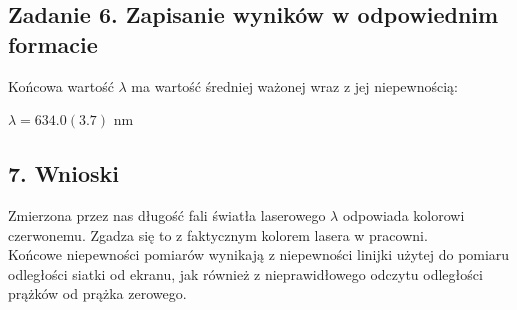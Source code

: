 \documentclass[12pt]{article}
\begin{document}
\subsection*{Zadanie 6. Zapisanie wyników w odpowiednim formacie}
Końcowa wartość $\lambda$ ma wartość średniej ważonej wraz z jej niepewnością:
\begin{center}
    $\lambda = 634.0(3.7) $ nm
\end{center}

\subsection*{7. Wnioski}
Zmierzona przez nas długość fali światła laserowego $\lambda$ odpowiada kolorowi czerwonemu.
Zgadza się to z faktycznym kolorem lasera w pracowni. \\
Końcowe niepewności pomiarów wynikają z niepewności linijki użytej do pomiaru
odległości siatki od ekranu, jak również z nieprawidłowego odczytu odległości prążków od prążka zerowego.
\end{document}
